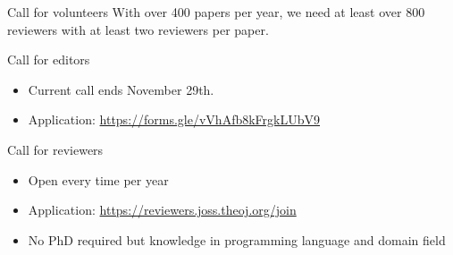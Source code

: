 \begin{frame}{Call for volunteers}
With over 400 papers per year, we need at least over 800 reviewers with at least two reviewers per paper.
\vspace{0.5cm}
\begin{block}{Call for editors}
\begin{itemize}
\item Current call ends November 29th. 
\item Application: \url{https://forms.gle/vVhAfb8kFrgkLUbV9}
\end{itemize}

\end{block}

\begin{block}{Call for reviewers}
\begin{itemize}
\item Open every time per year
\item Application: \url{https://reviewers.joss.theoj.org/join}
\item No PhD required but knowledge in programming language and domain field
\end{itemize}

\end{block}


\end{frame}

